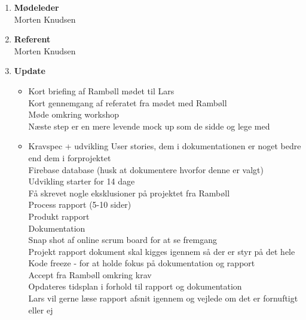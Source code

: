 	\begin{enumerate}
		\itemsep 0.3em 
		\item \textbf{Mødeleder}\\
			Morten Knudsen
		\item \textbf{Referent}\\
			Morten Knudsen

		\item \textbf{Update}
			\begin{itemize}[-]
			\item Kort briefing af Rambøll mødet til Lars\\
			Kort gennemgang af referatet fra mødet med Rambøll	\\
			Møde omkring workshop \\
			Næste step er en mere levende mock up som de sidde og lege med \\
		
			
			\item Kravspec + udvikling
			User stories, dem i dokumentationen er noget bedre end dem i forprojektet \\
			Firebase database (husk at dokumentere hvorfor denne er valgt) \\
			Udvikling starter for 14 dage \\
			Få skrevet nogle eksklusioner på projektet fra Rambøll \\
			
			Process rapport (5-10 sider) \\
			Produkt rapport \\
			Dokumentation \\
			
			Snap shot af online scrum board for at se fremgang \\
			
			Projekt rapport dokument skal kigges igennem så der er styr på det hele \\
			
			Kode freeze - for at holde fokus på dokumentation og rapport \\
			
			Accept fra Rambøll omkring krav \\
			
			Opdateres tidsplan i forhold til rapport og dokumentation \\
			
			Lars vil gerne læse rapport afsnit igennem og vejlede om det er fornuftigt eller ej \\
			

\end{itemize}
\end{enumerate}
